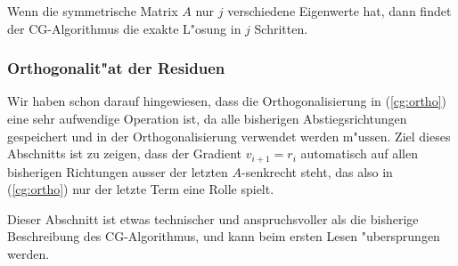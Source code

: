 \begin{satz}
Wenn die symmetrische Matrix $A$ nur $j$ verschiedene Eigenwerte hat,
dann findet der CG-Algorithmus die exakte L"osung in $j$ Schritten.
\end{satz}

\subsubsection{Orthogonalit"at der Residuen}
Wir haben schon darauf hingewiesen, dass die Orthogonalisierung in
(\ref{cg:ortho}) eine sehr aufwendige Operation ist, da alle bisherigen
Abstiegsrichtungen gespeichert und in der Orthogonalisierung verwendet
werden m"ussen.
Ziel dieses Abschnitts ist zu zeigen, dass der Gradient
$v_{i+1}=r_i$ automatisch auf allen bisherigen Richtungen
ausser der letzten $A$-senkrecht steht,
das also in (\ref{cg:ortho}) nur der letzte Term eine Rolle spielt.

Dieser Abschnitt ist etwas technischer und anspruchsvoller als die 
bisherige Beschreibung des CG-Algorithmus, und kann beim ersten Lesen
"ubersprungen werden.
\medskip

